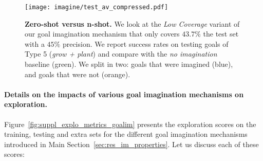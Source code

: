 \begin{figure}[!h]
      \centering
      \texttt{[image: imagine/test\_av\_compressed.pdf]}
      \caption{\textbf{Zero-shot versus n-shot.} We look at the \textit{Low Coverage} variant of our goal imagination mechanism that only covers $43.7\%$ the test set with a $45\%$ precision. We report success rates on testing goals of Type 5 (\textit{grow + plant}) and compare with the \textit{no imagination} baseline (green). We split in two: goals that were imagined (blue), and goals that were not (orange). \label{fig:suppl_halftc}}
\end{figure} 

\clearpage
\paragraph{Details on the impacts of various goal imagination mechanisms on exploration.}
Figure~\ref{fig:suppl_explo_metrics_goalim} presents the \itwoc exploration scores on the training, testing and extra sets for the different goal imagination mechanisms introduced in Main Section~\ref{sec:res_im_properties}. Let us discuss each of these scores:

